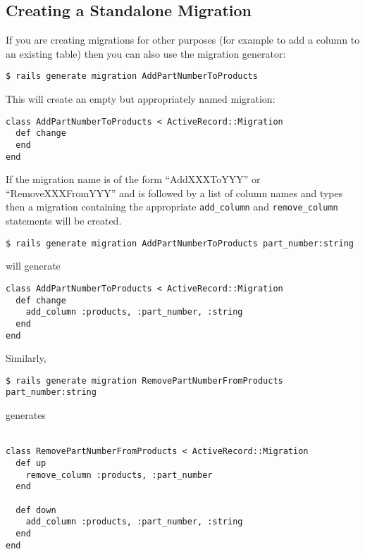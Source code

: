\documentclass[10pt]{book}
\begin{document}
\subsection{ Creating a Standalone Migration}

If you are creating migrations for other purposes (for example to add a column to an existing table) then you can also use the migration generator:
\begin{verbatim}
$ rails generate migration AddPartNumberToProducts
\end{verbatim}


This will create an empty but appropriately named migration:

\begin{verbatim}
class AddPartNumberToProducts < ActiveRecord::Migration
  def change
  end
end
\end{verbatim}


If the migration name is of the form “AddXXXToYYY” or “RemoveXXXFromYYY” and is followed by a list of column names and types then a migration containing the appropriate \texttt{add\_column} and \texttt{remove\_column} statements will be created.
\begin{verbatim}
$ rails generate migration AddPartNumberToProducts part_number:string
\end{verbatim}


will generate
\begin{verbatim}
class AddPartNumberToProducts < ActiveRecord::Migration
  def change
    add_column :products, :part_number, :string
  end
end
\end{verbatim}

Similarly,
\begin{verbatim}
$ rails generate migration RemovePartNumberFromProducts part_number:string
\end{verbatim}


generates
\\ \\
\begin{minipage}{\textwidth}
\begin{verbatim}
class RemovePartNumberFromProducts < ActiveRecord::Migration
  def up
    remove_column :products, :part_number
  end
 
  def down
    add_column :products, :part_number, :string
  end
end
\end{verbatim}
\end{minipage}
\\ \\
\end{document}
